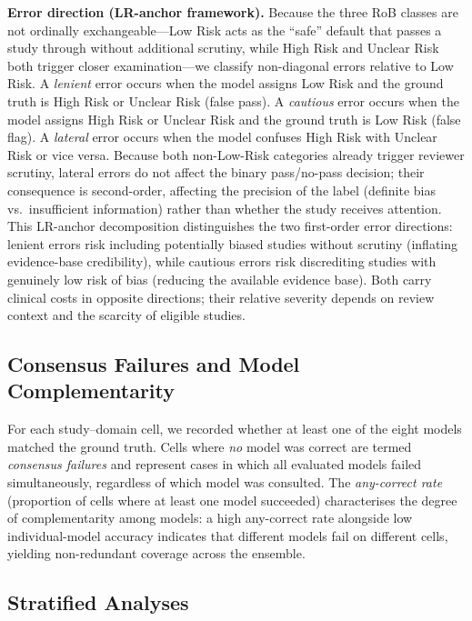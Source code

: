 \documentclass[../main.tex]{subfiles}
\begin{document}
\textbf{Error direction (LR-anchor framework).}
Because the three RoB classes are not ordinally exchangeable---Low Risk acts as
the ``safe'' default that passes a study through without additional scrutiny,
while High Risk and Unclear Risk both trigger closer examination---we classify
non-diagonal errors relative to Low Risk.
A \emph{lenient} error occurs when the model assigns Low Risk and the ground
truth is High Risk or Unclear Risk (false pass).
A \emph{cautious} error occurs when the model assigns High Risk or Unclear Risk
and the ground truth is Low Risk (false flag).
A \emph{lateral} error occurs when the model confuses High Risk with Unclear Risk
or vice versa.
Because both non-Low-Risk categories already trigger reviewer scrutiny,
lateral errors do not affect the binary pass/no-pass decision; their
consequence is second-order, affecting the precision of the label
(definite bias vs.\ insufficient information) rather than whether the
study receives attention.
This LR-anchor decomposition distinguishes the two first-order error
directions: lenient errors risk including potentially biased studies
without scrutiny (inflating evidence-base credibility), while cautious
errors risk discrediting studies with genuinely low risk of bias
(reducing the available evidence base).
Both carry clinical costs in opposite directions; their relative severity
depends on review context and the scarcity of eligible studies.

\subsection{Consensus Failures and Model Complementarity}
\label{sec:methods-complementarity}

For each study--domain cell, we recorded whether at least one of the eight models
matched the ground truth.
Cells where \emph{no} model was correct are termed \emph{consensus failures} and
represent cases in which all evaluated models failed simultaneously, regardless of
which model was consulted.
The \emph{any-correct rate} (proportion of cells where at least one model
succeeded) characterises the degree of complementarity among models: a high
any-correct rate alongside low individual-model accuracy indicates that different
models fail on different cells, yielding non-redundant coverage across the
ensemble.

\subsection{Stratified Analyses}
\label{sec:methods-strata}
\end{document}
